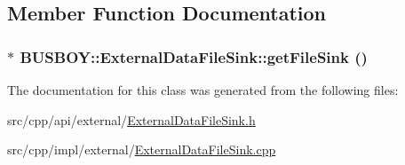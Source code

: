 \subsection{Member Function Documentation}
\hypertarget{classBUSBOY_1_1ExternalDataFileSink_aa6e477790be9a62bf2ffa4d8d2894a2c}{
\subsubsection[{getFileSink}]{ $\ast$ BUSBOY::ExternalDataFileSink::getFileSink ()}}
\label{classBUSBOY_1_1ExternalDataFileSink_aa6e477790be9a62bf2ffa4d8d2894a2c}


The documentation for this class was generated from the following files:\begin{DoxyCompactItemize}
\item 
src/cpp/api/external/\hyperlink{ExternalDataFileSink_8h}{ExternalDataFileSink.h}\item 
src/cpp/impl/external/\hyperlink{ExternalDataFileSink_8cpp}{ExternalDataFileSink.cpp}\end{DoxyCompactItemize}
